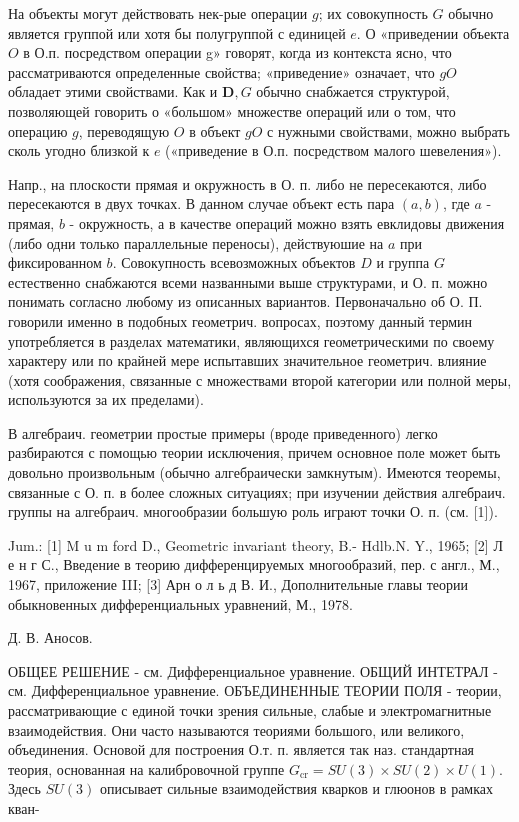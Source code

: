 \documentclass[10pt]{article}
\begin{document}
На объекты могут действовать нек-рые операции $g$; их совокупность $G$ обычно является группой или хотя бы полугруппой с единицей $e$. О «приведении объекта $O$ в О.п. посредством операции g» говорят, когда из контекста ясно, что рассматриваются определенные свойства; «приведение» означает, что $g O$ обладает этими свойствами. Как и $\boldsymbol{D}, G$ обычно снабжается структурой, позволяющей говорить о «большом» множестве операций или о том, что операцию $g$, переводящую $O$ в объект $g O$ с нужными свойствами, можно выбрать сколь угодно близкой к $e$ («приведение в О.п. посредством малого шевеления»).



Напр., на плоскости прямая и окружность в О. п. либо не пересекаются, либо пересекаются в двух точках. В данном случае объект есть пара $(a, b)$, где $a$ - прямая, $b$ - окружность, а в качестве операций можно взять евклидовы движения (либо одни только параллельные переносы), действуюшие на $a$ при фиксированном $b$. Совокупность всевозможных объектов $D$ и группа $G$ естественно снабжаются всеми названными выше структурами, и О. п. можно понимать согласно любому из описанных вариантов. Первоначально об О. П. говорили именно в подобных геометрич. вопросах, поэтому данный термин употребляется в разделах математики, являющихся геометрическими по своему характеру или по крайней мере испытавших значительное геометрич. влияние (хотя соображения, связанные с множествами второй категории или полной меры, используются за их пределами).



В алгебраич. геометрии простые примеры (вроде приведенного) легко разбираются с помощью теории исключения, причем основное поле может быть довольно произвольным (обычно алгебраически замкнутым). Имеются теоремы, связанные с О. п. в более сложных ситуациях; при изучении действия алгебраич. группы на алгебраич. многообразии большую роль играют точки О. п. (см. [1]).



Jum.: [1] M u m ford D., Geometric invariant theory, B.- Hdlb.N. Y., 1965; [2] Л е н г С., Введение в теорию дифференцируемых многообразий, пер. с англ., М., 1967, приложение III; [3] Арн о л ь д В. И., Дополнительные главы теории обыкновенных дифференциальных уравнений, М., 1978.



Д. В. Аносов.



ОБЩЕЕ РЕШЕНИЕ - см. Дифференциальное уравнение. ОБЩИЙ ИНТЕТРАЛ - см. Дифференциальное уравнение. ОБЪЕДИНЕННЫЕ ТЕОРИИ ПОЛЯ - теории, рассматривающие с единой точки зрения сильные, слабые и электромагнитные взаимодействия. Они часто называются теориями большого, или великого, объединения. Основой для построения О.т. п. является так наз. стандартная теория, основанная на калибровочной группе $G_{\mathrm{cr}}=S U(3) \times S U(2) \times U(1)$. Здесь $S U(3)$ описывает сильные взаимодействия кварков и глюонов в рамках кван-
\end{document}
